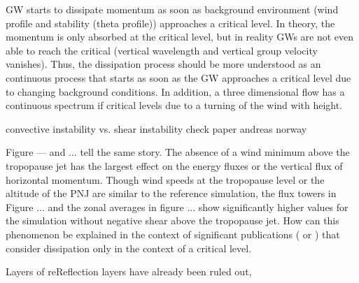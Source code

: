 
GW starts to dissipate momentum as soon as background environment (wind profile and stability (theta profile)) approaches a critical level. In theory, the momentum is only absorbed at the critical level, but in reality GWs are not even able to reach the critical (vertical wavelength and vertical group velocity vanishes). Thus, the dissipation process should be more understood as an continuous process that starts as soon as the GW approaches a critical level due to changing background conditions. In addition, a three dimensional flow has a continuous spectrum if critical levels due to a turning of the wind with height. 


convective instability vs. shear instability 
check paper andreas norway

Figure --- and ... tell the same story. The absence of a wind minimum above the tropopause jet has the largest effect on the energy fluxes or the vertical flux of horizontal momentum. Though wind speeds at the tropopause level or the altitude of the PNJ are similar to the reference simulation, the flux towers in Figure ... and the zonal averages in figure ... show significantly higher values for the simulation without negative shear above the tropopause jet. How can this phenomenon be explained in the context of significant publications (\cite[]{eliassen_transfer_1960} or \cite[]{bretherton_momentum_1969}) that consider dissipation only in the context of a critical level. 


Layers of reReflection layers have already been ruled out, 

\textcite[]{teixeira_physics_2014} 


